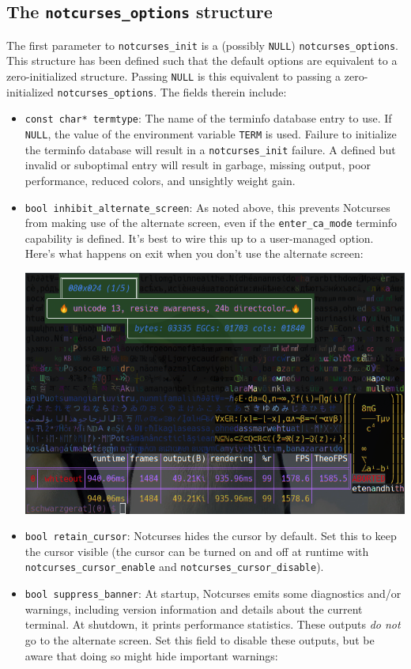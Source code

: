 \documentclass[letterpaper,10pt]{article}
\newenvironment{denseitemize}{
  \begin{itemize}
      \setlength{\itemsep}{0pt}
}{
  \end{itemize}
}
\begin{document}
\subsection{The \texttt{notcurses\_options} structure}
The first parameter to \texttt{notcurses\_init} is a (possibly \texttt{NULL})
\texttt{notcurses\_options}. This structure has been defined such that the
default options are equivalent to a zero-initialized structure. Passing \texttt{NULL}
is this equivalent to passing a zero-initialized \texttt{notcurses\_options}.
The fields therein include:
\begin{denseitemize}
\item{\texttt{const char* termtype}: The name of the terminfo database entry to
    use. If \texttt{NULL}, the value of the environment variable \texttt{TERM}
    is used. Failure to initialize the terminfo database will result in a
    \texttt{notcurses\_init} failure.} A defined but invalid or suboptimal
    entry will result in garbage, missing output, poor performance, reduced
    colors, and unsightly weight gain.
\item{\texttt{bool inhibit\_alternate\_screen}: As noted above, this prevents
    Notcurses from making use of the alternate screen, even if the \texttt{enter\_ca\_mode}
    terminfo capability is defined. It's best to wire this up to a user-managed
    option. Here's what happens on exit when you don't use the alternate
    screen:

    \begin{center}
      \includegraphics[width=.7\linewidth]{media/no-alternate-screen.png}
    \end{center}
  }
\item{\texttt{bool retain\_cursor}: Notcurses hides the cursor by default.
    Set this to keep the cursor visible (the cursor can be turned on and off
    at runtime with \texttt{notcurses\_cursor\_enable} and
    \texttt{notcurses\_cursor\_disable}).}
\item{\texttt{bool suppress\_banner}: At startup, Notcurses emits some
    diagnostics and/or warnings, including version information and details
    about the current terminal. At shutdown, it prints performance statistics.
    These outputs \textit{do not} go to the alternate screen. Set this
    field to disable these outputs, but be aware that doing so might hide
    important warnings:

}
\end{denseitemize}
\end{document}
